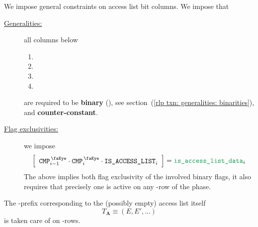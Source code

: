We impose general constraints on access list bit columns.
We impose that
\begin{description}
    \item[\underline{Generalities:}]
	all columns below
	\begin{multicols}{2}
	    \begin{enumerate}
		\item \rlpTxnSharedColumnIsPrefixOfAccessListItem
		\item \rlpTxnSharedColumnIsPrefixOfStorageKeyList
		\item \rlpTxnSharedColumnIsAccessListAddress
		\item \rlpTxnSharedColumnIsAccessListStorageKey
	    \end{enumerate}
	\end{multicols}
	are required to be \textbf{binary} (\sanityCheck),
	see section~(\ref{rlp txn: generalities: binarities}),
	and \textbf{counter-constant}.
    \item[\underline{Flag exclusivities:}]
	we impose
	\[
	    \left[ \begin{array}{c}
		\isCmp _{i - 1} \cdot \isCmp _{i} \cdot \phaseAccessList _{i} \\
	    \end{array} \right]
	    = \locAccessListData _{i}
	\]
	\saNote{}
	The above implies both flag exclusivity of the involved binary flags,
	it also requires that precisely one is active on any \locAccessListData{}-row
	of the \phaseAccessList{} phase.
\end{description}

\saNote{}
The \rlp{}-prefix corresponding to the (possibly empty) access list itself
\[
    T_\mathbf{A} \equiv (E, E', \dots)
\]
is taken care of on \locAccessListPrefix{}-rows.
